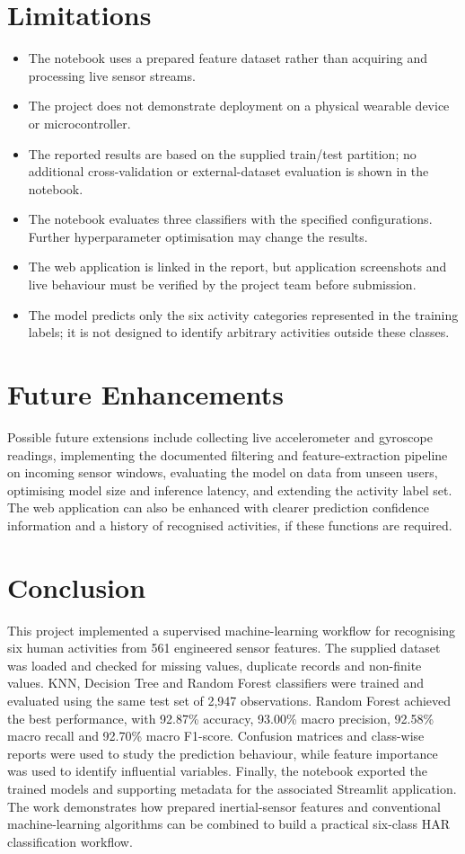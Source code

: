 \section{Limitations}
\begin{itemize}
\item The notebook uses a prepared feature dataset rather than acquiring and processing live sensor streams.
\item The project does not demonstrate deployment on a physical wearable device or microcontroller.
\item The reported results are based on the supplied train/test partition; no additional cross-validation or external-dataset evaluation is shown in the notebook.
\item The notebook evaluates three classifiers with the specified configurations. Further hyperparameter optimisation may change the results.
\item The web application is linked in the report, but application screenshots and live behaviour must be verified by the project team before submission.
\item The model predicts only the six activity categories represented in the training labels; it is not designed to identify arbitrary activities outside these classes.
\end{itemize}

\section{Future Enhancements}
Possible future extensions include collecting live accelerometer and gyroscope readings, implementing the documented filtering and feature-extraction pipeline on incoming sensor windows, evaluating the model on data from unseen users, optimising model size and inference latency, and extending the activity label set. The web application can also be enhanced with clearer prediction confidence information and a history of recognised activities, if these functions are required.

\section{Conclusion}
This project implemented a supervised machine-learning workflow for recognising six human activities from 561 engineered sensor features. The supplied dataset was loaded and checked for missing values, duplicate records and non-finite values. KNN, Decision Tree and Random Forest classifiers were trained and evaluated using the same test set of 2,947 observations. Random Forest achieved the best performance, with 92.87\% accuracy, 93.00\% macro precision, 92.58\% macro recall and 92.70\% macro F1-score. Confusion matrices and class-wise reports were used to study the prediction behaviour, while feature importance was used to identify influential variables. Finally, the notebook exported the trained models and supporting metadata for the associated Streamlit application. The work demonstrates how prepared inertial-sensor features and conventional machine-learning algorithms can be combined to build a practical six-class HAR classification workflow.

